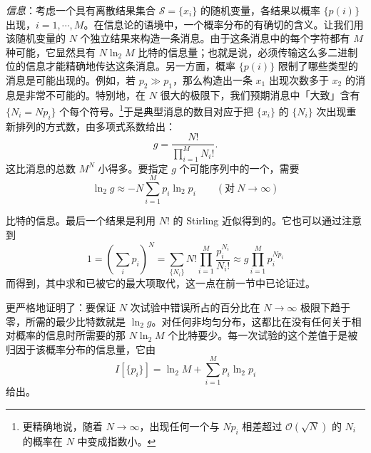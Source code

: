 
\emph{信息}：考虑一个具有离散结果集合 $\mathscr{S}=\{x_i\}$ 的随机变量，各结果以概率 $\{p(i)\}$ 出现，$i=1,\cdots,M$。在信息论的语境中，一个概率分布的有确切的含义。让我们用该随机变量的 $N$ 个独立结果来构造一条消息。由于这条消息中的每个字符都有 $M$ 种可能，它显然具有 $N\ln_2M$ 比特的信息量；也就是说，必须传输这么多二进制位的信息才能精确地传达这条消息。另一方面，概率 $\{p(i)\}$ 限制了哪些类型的消息是可能出现的。例如，若 $p_2\gg p_1$，那么构造出一条 $x_1$ 出现次数多于 $x_2$ 的消息是非常不可能的。特别地，在 $N$ 很大的极限下，我们预期消息中「大致」含有 $\{N_i=Np_i\}$ 个每个符号。\footnote{更精确地说，随着 $N\to\infty$，出现任何一个与 $Np_i$ 相差超过 $\mathcal{O}(\sqrt{N})$ 的 $N_i$ 的概率在 $N$ 中变成指数小。}于是典型消息的数目对应于把 $\{x_i\}$ 的 $\{N_i\}$ 次出现重新排列的方式数，由多项式系数给出：
\begin{equation}\label{eq:2.67}
  g=\frac{N!}{\prod_{i=1}^{M}N_i!}.
\end{equation}
这比消息的总数 $M^N$ 小得多。要指定 $g$ 个可能序列中的一个，需要
\begin{equation}\label{eq:2.68}
  \ln_2g\approx-N\sum_{i=1}^{M}p_i\ln_2p_i\qquad(\text{对}\ N\to\infty)
\end{equation}

比特的信息。最后一个结果是利用 $N!$ 的 Stirling 近似得到的。它也可以通过注意到
\begin{equation}\label{eq:2.69}
  1=\left(\sum_i p_i\right)^N=\sum_{\{N_i\}}N!\prod_{i=1}^{M}\frac{p_i^{N_i}}{N_i!}\approx g\prod_{i=1}^{M}p_i^{Np_i}
\end{equation}
而得到，其中求和已被它的最大项取代，这一点在前一节中已论证过。

更严格地证明了：要保证 $N$ 次试验中错误所占的百分比在 $N\to\infty$ 极限下趋于零，所需的最少比特数就是 $\ln_2g$。对任何非均匀分布，这都比在没有任何关于相对概率的信息时所需要的那 $N\ln_2M$ 个比特要少。每一次试验的这个差值于是被归因于该概率分布的信息量，它由
\begin{equation}\label{eq:2.70}
  I\left[\{p_i\}\right]=\ln_2M+\sum_{i=1}^{M}p_i\ln_2p_i
\end{equation}
给出。

